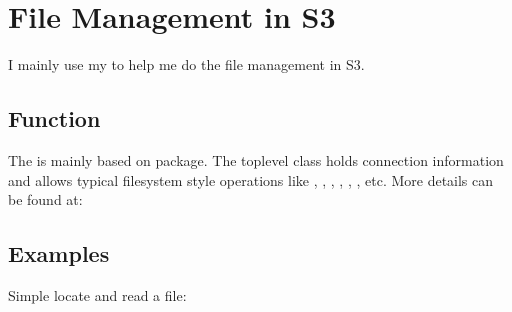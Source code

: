 \documentclass[letterpaper,12pt,english]{sphinxmanual}
\begin{document}
\section{File Management in S3}
\label{\detokenize{s3:file-management-in-s3}}
\sphinxAtStartPar
I mainly use my  to help me do the file management in S3.


\subsection{ Function}
\label{\detokenize{s3:s3-fs-function}}
\sphinxAtStartPar
The  is mainly based on  package. The top\sphinxhyphen{}level class
 holds connection information and allows typical file\sphinxhyphen{}system style
operations like , , , , , , etc.
More details can be found at:

\begin{sphinxVerbatim}[commandchars=\\\{\}]
 

  
                          \PYG{p}{[}\PYG{p}{]}
                          \PYG{p}{[}\PYG{p}{]}
                          \PYG{p}{[}\PYG{p}{]}
\end{sphinxVerbatim}


\subsection{Examples}
\label{\detokenize{s3:id2}}
\sphinxAtStartPar
Simple locate and read a file:
\end{document}
